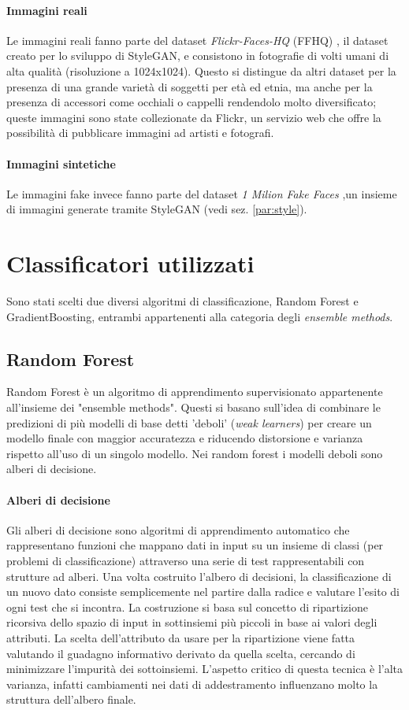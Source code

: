 \paragraph{Immagini reali}Le immagini reali fanno parte del dataset \textit{Flickr-Faces-HQ} (FFHQ) \cite{NVlabsFfhqdataset2025}, il dataset creato per lo sviluppo di StyleGAN, e consistono in fotografie di volti umani di alta qualità (risoluzione a 1024x1024). Questo si distingue da altri dataset per la presenza di una grande varietà di soggetti per età ed etnia, ma anche per la presenza di accessori come occhiali o cappelli \cite{karras2019style} rendendolo molto diversificato; queste immagini sono state collezionate da Flickr, un servizio web che offre la possibilità di pubblicare immagini ad artisti e fotografi.
\paragraph{Immagini sintetiche}Le immagini fake invece fanno parte del dataset \textit{1 Milion Fake Faces} ,un insieme di immagini generate tramite StyleGAN (vedi sez. \ref{par:style}). 
\section{Classificatori utilizzati}
Sono stati scelti due diversi algoritmi di classificazione, Random Forest e GradientBoosting, entrambi appartenenti alla categoria degli \textit{ensemble methods}.
\subsection{Random Forest}
Random Forest è un algoritmo di apprendimento supervisionato appartenente all'insieme dei "ensemble methods". Questi si basano sull'idea di combinare le predizioni di più modelli di base detti 'deboli' (\textit{weak learners}) per creare un modello finale con maggior accuratezza e riducendo distorsione e varianza rispetto all'uso di un singolo modello. Nei random forest i modelli deboli sono alberi di decisione.
\paragraph{Alberi di decisione}
Gli alberi di decisione sono algoritmi di apprendimento automatico che rappresentano funzioni che mappano dati in input su un insieme di classi (per problemi di classificazione) attraverso una serie di test rappresentabili con strutture ad alberi. Una volta costruito l'albero di decisioni, la classificazione di un nuovo dato consiste semplicemente nel partire dalla radice e valutare l'esito di ogni test che si incontra. La costruzione si basa sul concetto di ripartizione ricorsiva dello spazio di input in sottinsiemi più piccoli in base ai valori degli attributi. La scelta dell'attributo da usare per la ripartizione viene fatta valutando il guadagno informativo derivato da quella scelta, cercando di minimizzare l'impurità dei sottoinsiemi.
L'aspetto critico di questa tecnica è l'alta varianza, infatti cambiamenti nei dati di addestramento influenzano molto la struttura dell'albero finale.
